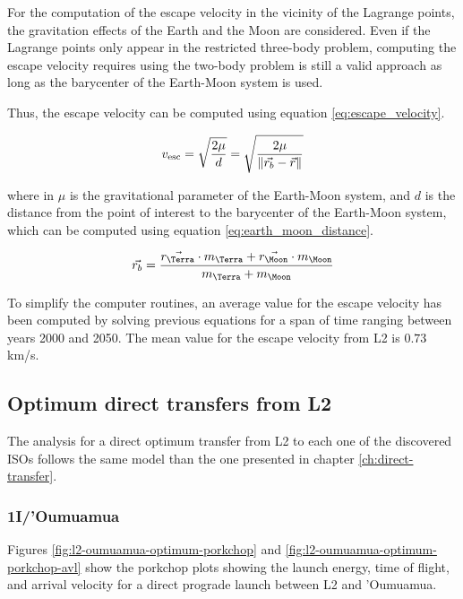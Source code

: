 For the computation of the escape velocity in the vicinity of the Lagrange
points, the gravitation effects of the Earth and the Moon are considered. Even
if the Lagrange points only appear in the restricted three-body problem,
computing the escape velocity requires using the two-body problem is still a
valid approach as long as the barycenter of the Earth-Moon system is used.

Thus, the escape velocity can be computed using equation \ref{eq:escape_velocity}.

\begin{equation}
  v_{\text{esc}} = \sqrt{\frac{2 \mu}{d}} = \sqrt{\frac{2 \mu}{\lVert\vec{r_b} - \vec{r}\rVert}}
  \label{eq:escape_velocity}
\end{equation}

where in $\mu$ is the gravitational parameter of the Earth-Moon system, and $d$
is the distance from the point of interest to the barycenter of the Earth-Moon
system, which can be computed using equation \ref{eq:earth_moon_distance}.

\begin{equation}
  \vec{r_{b}} = \frac{\vec{r_{\text{\Terra}}} \cdot m_{\text{\Terra}}
    + \vec{r_{\text{\Moon}}} \cdot m_{\text{\Moon}}}{m_{\text{\Terra}} +
    m_{\text{\Moon}}}
  \label{eq:earth_moon_distance}
\end{equation}

To simplify the computer routines, an average value for the escape velocity has
been computed by solving previous equations for a span of time ranging between
years 2000 and 2050. The mean value for the escape velocity from L2 is $0.73$
km/s.

\subsection{Optimum direct transfers from L2}

The analysis for a direct optimum transfer from L2 to each one of the discovered
ISOs follows the same model than the one presented in chapter
\ref{ch:direct-transfer}.

\subsubsection{1I/'Oumuamua}

Figures \ref{fig:l2-oumuamua-optimum-porkchop} and
\ref{fig:l2-oumuamua-optimum-porkchop-avl} show the porkchop plots showing the
launch energy, time of flight, and arrival velocity for a direct prograde launch
between L2 and 'Oumuamua.

